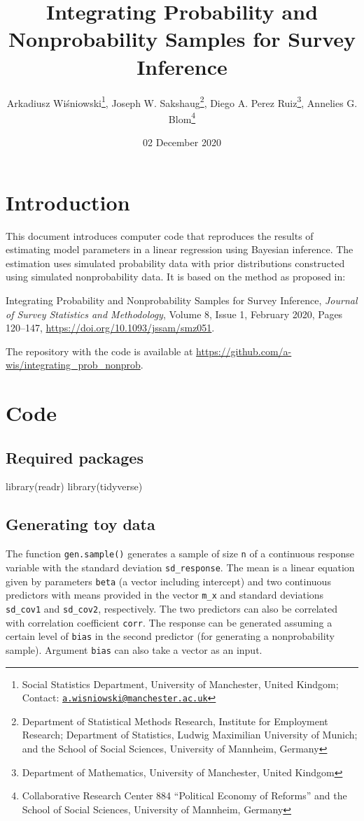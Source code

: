 \documentclass[
]{article}
\title{Integrating Probability and Nonprobability Samples for Survey
Inference}
\author{Arkadiusz Wiśniowski\footnote{Social Statistics Department,
  University of Manchester, United Kindgom; Contact:
  \href{mailto:a.wisniowski@manchester.ac.uk}{\nolinkurl{a.wisniowski@manchester.ac.uk}}},
Joseph W. Sakshaug\footnote{Department of Statistical Methods Research,
  Institute for Employment Research; Department of Statistics, Ludwig
  Maximilian University of Munich; and the School of Social Sciences,
  University of Mannheim, Germany}, Diego A. Perez Ruiz\footnote{Department
  of Mathematics, University of Manchester, United Kindgom}, Annelies G.
Blom\footnote{Collaborative Research Center 884 ``Political Economy of
  Reforms'' and the School of Social Sciences, University of Mannheim,
  Germany}}
\date{02 December 2020}
\newenvironment{Shaded}{\begin{snugshade}}{\end{snugshade}}
\newcommand{\FunctionTok}[1]{\textcolor[rgb]{0.00,0.00,0.00}{#1}}
\newcommand{\NormalTok}[1]{#1}
\begin{document}
\maketitle

\hypertarget{introduction}{%
\section{Introduction}\label{introduction}}

This document introduces computer code that reproduces the results of
estimating model parameters in a linear regression using Bayesian
inference. The estimation uses simulated probability data with prior
distributions constructed using simulated nonprobability data. It is
based on the method as proposed in:

Integrating Probability and Nonprobability Samples for Survey Inference,
\emph{Journal of Survey Statistics and Methodology}, Volume 8, Issue 1,
February 2020, Pages 120--147,
\url{https://doi.org/10.1093/jssam/smz051}.

The repository with the code is available at
\url{https://github.com/a-wis/integrating_prob_nonprob}.

\hypertarget{code}{%
\section{Code}\label{code}}

\hypertarget{required-packages}{%
\subsection{Required packages}\label{required-packages}}

\begin{Shaded}
\begin{Highlighting}[]
\FunctionTok{library}\NormalTok{(readr)}
\FunctionTok{library}\NormalTok{(tidyverse)}
\end{Highlighting}
\end{Shaded}

\hypertarget{generating-toy-data}{%
\subsection{Generating toy data}\label{generating-toy-data}}

The function \texttt{gen.sample()} generates a sample of size \texttt{n}
of a continuous response variable with the standard deviation
\texttt{sd\_response}. The mean is a linear equation given by parameters
\texttt{beta} (a vector including intercept) and two continuous
predictors with means provided in the vector \texttt{m\_x} and standard
deviations \texttt{sd\_cov1} and \texttt{sd\_cov2}, respectively. The
two predictors can also be correlated with correlation coefficient
\texttt{corr}. The response can be generated assuming a certain level of
\texttt{bias} in the second predictor (for generating a nonprobability
sample). Argument \texttt{bias} can also take a vector as an input.
\end{document}
